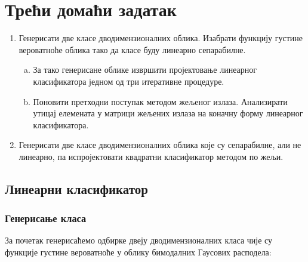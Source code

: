 \section{Трећи домаћи задатак}
\renewcommand{\lstlistingname}{Одсечак кода}%
\begin{enumerate}[1.]
\item Генерисати две класе дводимензионалних облика. Изабрати функцију густине вероватноће облика тако да класе буду линеарно сепарабилне.
\begin{enumerate}[a)]
\item За тако генерисане облике извршити пројектовање линеарног класификатора једном од три итеративне процедуре.
\item Поновити претходни поступак методом жељеног излаза. Анализирати утицај елемената у матрици жељених излаза на коначну форму линеарног класификатора.
\end{enumerate}
\item Генерисати две класе дводимензионалних облика које су сепарабилне, али не линеарно, па испројектовати квадратни класификатор методом по жељи.
\end{enumerate}
\subsection{Линеарни класификатор}
\subsubsection{Генерисање класа}
За почетак генерисаћемо одбирке двеју дводимензионалних класа чије су функције густине вероватноће у облику бимодалних Гаусових расподела:


